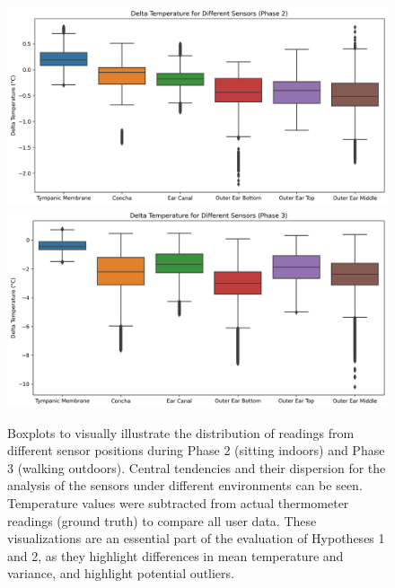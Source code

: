 \begin{figure}[!ht]
    \centering
    \includegraphics[width=\textwidth]{thesis-doc/images/study1/hypothesis1/hypothesis1_boxplot_phase_2.png}
    \includegraphics[width=\textwidth]{thesis-doc/images/study1/hypothesis1/hypothesis1_boxplot_phase_3.png}
    \caption{Boxplots to visually illustrate the distribution of readings from different sensor positions during Phase 2 (sitting indoors) and Phase 3 (walking outdoors). Central tendencies and their dispersion for the analysis of the sensors under different environments can be seen. Temperature values were subtracted from actual thermometer readings (ground truth) to compare all user data. These visualizations are an essential part of the evaluation of Hypotheses 1 and 2, as they highlight differences in mean temperature and variance, and highlight potential outliers.}
    \label{fig:eval:study1:hypothesis1_result}
\end{figure}

